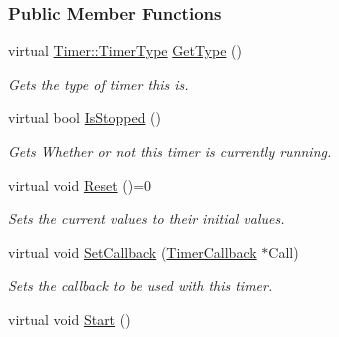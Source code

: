 \subsubsection*{Public Member Functions}
\begin{DoxyCompactItemize}
\item 
virtual \hyperlink{classphys_1_1Timer_aacbbca9cc5543fc8414de59cd085c1c1}{Timer::TimerType} \hyperlink{classphys_1_1Timer_af0eaa87bf3074047db36ba1c6fd33c70}{GetType} ()
\begin{DoxyCompactList}\small\item\em Gets the type of timer this is. \item\end{DoxyCompactList}\item 
\hypertarget{classphys_1_1Timer_a3cdb46639055107c23c3de971d913ec1}{
virtual bool \hyperlink{classphys_1_1Timer_a3cdb46639055107c23c3de971d913ec1}{IsStopped} ()}
\label{classphys_1_1Timer_a3cdb46639055107c23c3de971d913ec1}

\begin{DoxyCompactList}\small\item\em Gets Whether or not this timer is currently running. \item\end{DoxyCompactList}\item 
\hypertarget{classphys_1_1Timer_a6010a6dab70b542c3e9d5a09caa422f7}{
virtual void \hyperlink{classphys_1_1Timer_a6010a6dab70b542c3e9d5a09caa422f7}{Reset} ()=0}
\label{classphys_1_1Timer_a6010a6dab70b542c3e9d5a09caa422f7}

\begin{DoxyCompactList}\small\item\em Sets the current values to their initial values. \item\end{DoxyCompactList}\item 
virtual void \hyperlink{classphys_1_1Timer_a046ca4f7dcf2503e5993a18e11172f5e}{SetCallback} (\hyperlink{classphys_1_1TimerCallback}{TimerCallback} $\ast$Call)
\begin{DoxyCompactList}\small\item\em Sets the callback to be used with this timer. \item\end{DoxyCompactList}\item 
\hypertarget{classphys_1_1Timer_a2ec14a41cda7c31637351ab63f63304a}{
virtual void \hyperlink{classphys_1_1Timer_a2ec14a41cda7c31637351ab63f63304a}{Start} ()}
\label{classphys_1_1Timer_a2ec14a41cda7c31637351ab63f63304a}


\end{DoxyCompactItemize}

